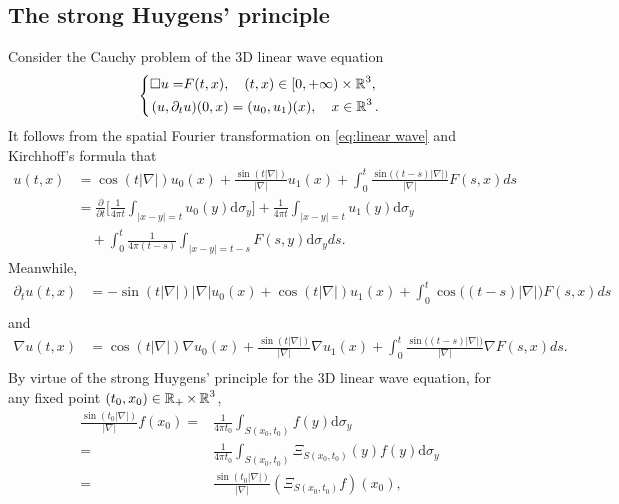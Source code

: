 \documentclass[11pt,twoside]{article}
\def\R{\mathop{\mathbb R\kern 0pt}\nolimits}
\def\p{\partial}
\newcommand{\abs}[1]{\left|#1\right|}
\newcommand{\dS}{\mathrm{d}\sigma_y}
\theoremstyle{plain}
\theoremstyle{definition}
\numberwithin{equation}{section}
\begin{document}
	\subsection{The strong Huygens' principle}
	Consider the Cauchy problem of the 3D linear wave equation
	\begin{equation}\label{eq:linear wave}
		\left\{
		\begin{aligned}
			\square u = &F(t,x),\quad (t,x)\in[0,+\infty)\times\R^3,\\
			(u,\p_t&u)(0,x)=(u_{0},u_{1})(x),\quad x\in\R^3.
		\end{aligned}
		\right.
	\end{equation}
    It follows from the spatial Fourier transformation on \eqref{eq:linear wave} and Kirchhoff's formula that
	\begin{equation*}
		\begin{aligned}
			u(t,x) &= \cos(t|\nabla|)u_0(x) + \frac{\sin(t|\nabla|)}{|\nabla|}u_1(x) + \int_0^t \frac{\sin\big((t-s)|\nabla|\big)}{|\nabla|} F(s,x)ds \\
			&=\frac{\partial}{\partial t}\big[ \frac{1}{4\pi t} \int_{\abs{x-y}=t} u_0(y)\dS\big] + \frac{1}{4\pi t} \int_{\abs{x-y}=t} u_1(y)\dS \\
			&\quad + \int_0^t \frac{1}{4\pi (t-s)} \int_{\abs{x-y}=t-s} F(s,y)\dS ds.
		\end{aligned}
	\end{equation*}
	Meanwhile,
	\begin{equation*}
		\begin{aligned}
			\partial_t u(t,x) &= -\sin(t|\nabla|)|\nabla|u_0(x) + \cos(t|\nabla|) u_1(x) + \int_0^t \cos\big((t-s)|\nabla|\big) F(s,x)ds\\
		\end{aligned}
	\end{equation*}
	and
	\begin{equation*}
		\begin{aligned}
			\nabla u(t,x) &=\cos(t|\nabla|)\nabla u_0(x) + \frac{\sin(t|\nabla|)}{|\nabla|}\nabla u_1(x) + \int_0^t \frac{\sin\big((t-s)|\nabla|\big)}{|\nabla|} \nabla F(s,x)ds. \\
		\end{aligned}
	\end{equation*}
	By virtue of the strong Huygens' principle for the 3D linear wave equation, for any fixed point $(t_0,x_0)\in \R_+\times \R^3$,
	\begin{equation}\label{eq:Huygens1}
		\begin{split}
			\frac{\sin(t_0|\nabla|)}{|\nabla|}f(x_0)
			=& \frac{1}{4\pi t_0} \int_{S(x_0,t_0)} f(y)\dS\\
			=&  \frac{1}{4\pi t_0} \int_{S(x_0,t_0)} \Xi_{S(x_0,t_0)}(y)f(y)\dS \\
			=& \frac{\sin(t_0|\nabla|)}{|\nabla|}(\Xi_{S(x_0,t_0)}f)(x_0),\\
		\end{split}
	\end{equation}
\end{document}
